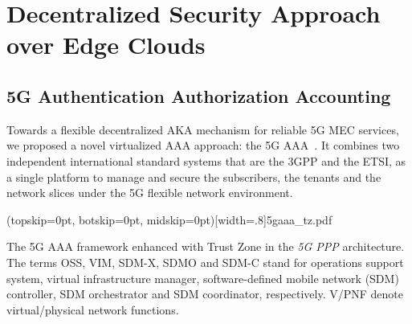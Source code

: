 \documentclass{ieeeaccess}
\begin{document}
	\section{Decentralized Security Approach\\ over Edge Clouds}\label{sec:architecture}
	\subsection{5G Authentication Authorization Accounting}\label{subsec:5gaaa}
	Towards a flexible decentralized AKA mechanism for reliable 5G MEC services, we proposed a novel virtualized AAA approach: the 5G AAA~\cite{stan2017v-aaa}. It combines two independent international standard systems that are the 3GPP and the ETSI, as a single platform to manage and secure the subscribers, the tenants and the network slices under the 5G flexible network environment.
	
	\Figure[htbp!](topskip=0pt, botskip=0pt, midskip=0pt)[width=.8\textwidth]{5gaaa_tz.pdf}
	{\parbox[t]{.91\textwidth}{The 5G AAA framework enhanced with Trust Zone in the \textit{5G PPP} architecture. The terms OSS, VIM, SDM-X, SDMO and SDM-C stand for operations support system, virtual infrastructure manager, software-defined mobile network (SDM) controller, SDM orchestrator and SDM coordinator, respectively. V/PNF denote virtual/physical network functions.}\label{fig:5gaaa_tz}}
	
\end{document}
